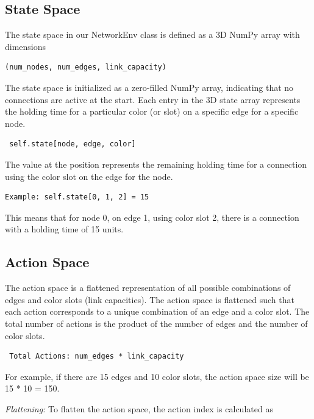\documentclass[conference]{IEEEtran}
\begin{document}
\subsection{\textbf{State Space}}

The state space in our NetworkEnv class is defined as a 3D NumPy array with dimensions \begin{verbatim}
(num_nodes, num_edges, link_capacity)
\end{verbatim}

\noindent The state space is initialized as a zero-filled NumPy array, indicating that no connections are active at the start. Each entry in the 3D state array represents the holding time for a particular color (or slot) on a specific edge for a specific node.

\begin{verbatim} self.state[node, edge, color]
\end{verbatim}
The value at the position represents the remaining holding time for a connection using the color slot on the edge for the node.
\begin{verbatim} 
Example: self.state[0, 1, 2] = 15
\end{verbatim}
This means that for node 0, on edge 1, using color slot 2, there is a connection with a holding time of 15 units.

\subsection{\textbf{Action Space}}


The action space is a flattened representation of all possible combinations of edges and color slots (link capacities). The action space is flattened such that each action corresponds to a unique combination of an edge and a color slot. The total number of actions is the product of the number of edges and the number of color slots.

\begin{verbatim} Total Actions: num_edges * link_capacity
\end{verbatim}
For example, if there are 15 edges and 10 color slots, the action space size will be 15 * 10 = 150.

\noindent\textit{Flattening:} To flatten the action space, the action index is calculated as
\end{document}
